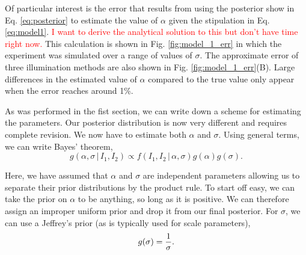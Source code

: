 Of particular interest is the error that results from using the posterior show in Eq. \ref{eq:posterior}
to estimate the value of $\alpha$ given the stipulation in Eq. \ref{eq:model1}. {\textcolor{red}{I
want to derive the analytical solution to this but don't have time right now.}} This calculation
is shown in Fig. \ref{fig:model_1_err} in which the experiment was simulated over a range of values
of $\sigma$. The approximate error of three illumination methods are also shown in Fig. \ref{fig:model_1_err}(B). Large differences in the estimated value of $\alpha$ compared to the
true value only appear when the error reaches around 1\%.

\begin{figure}[h]
\end{figure}

As was performed in the fist section, we can write down a scheme for estimating
the parameters. Our posterior distribution is now very different and requires
complete revision. We now have to estimate both $\alpha$ and $\sigma$. Using
general terms, we can write Bayes' theorem,
\begin{equation}
  g(\alpha, \sigma\, \vert\, I_1, I_2) \propto f(I_1, I_2\,\vert\, \alpha, \sigma)g(\alpha)g(\sigma).
  \label{model1_bayes}
\end{equation}

Here, we have assumed that $\alpha$ and $\sigma$ are independent parameters
allowing us to separate their prior distributions by the product rule. To start
off easy, we can take the prior on $\alpha$ to be anything, so long as it is positive.
We can therefore assign an improper uniform prior and drop it from our final
posterior. For $\sigma$, we can use a Jeffrey's prior (as is typically used
for scale parameters),
\begin{equation}
  g(\sigma) = {1 \over \sigma}.
\end{equation}

